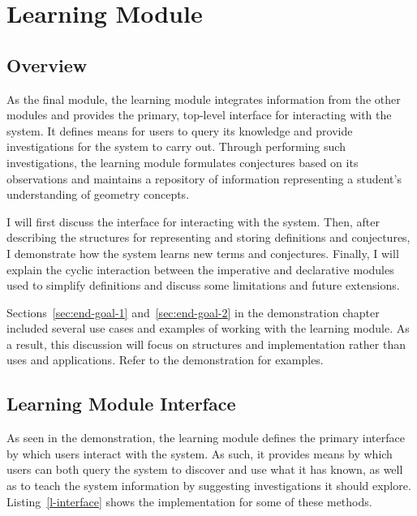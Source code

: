 \chapter{Learning Module}
\label{chap:learning}

\section{Overview}

As the final module, the learning module integrates information from
the other modules and provides the primary, top-level interface for
interacting with the system. It defines means for users to query its
knowledge and provide investigations for the system to carry
out. Through performing such investigations, the learning module
formulates conjectures based on its observations and maintains a
repository of information representing a student's understanding of
geometry concepts.

I will first discuss the interface for interacting with the
system. Then, after describing the structures for representing and
storing definitions and conjectures, I demonstrate how the system
learns new terms and conjectures. Finally, I will explain the cyclic
interaction between the imperative and declarative modules used to
simplify definitions and discuss some limitations and future
extensions.

Sections~\ref{sec:end-goal-1} and~\ref{sec:end-goal-2} in the
demonstration chapter included several use cases and examples of
working with the learning module. As a result, this discussion will
focus on structures and implementation rather than uses and
applications. Refer to the demonstration for examples.


\section{Learning Module Interface}

As seen in the demonstration, the learning module defines the primary
interface by which users interact with the system. As such, it
provides means by which users can both query the system to discover
and use what it has known, as well as to teach the system information
by suggesting investigations it should
explore. Listing~\ref{l-interface} shows the implementation for some
of these methods.

